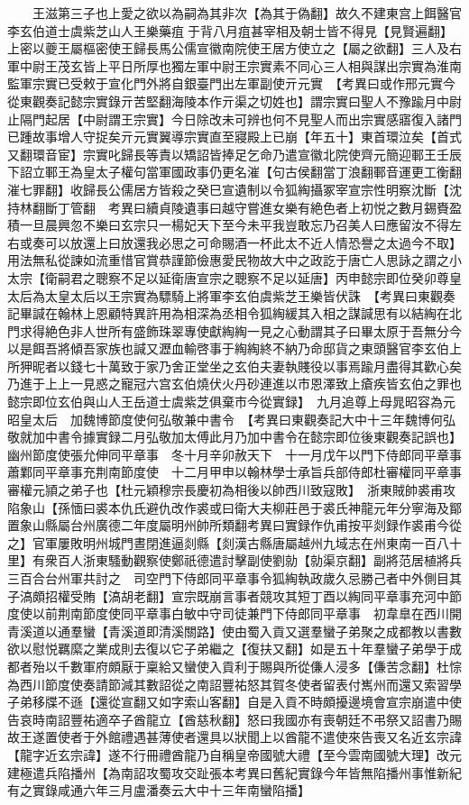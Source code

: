 　　王滋第三子也上愛之欲以為嗣為其非次【為其于偽翻】故久不建東宫上餌醫官李玄伯道士虞紫芝山人王樂藥疽于背八月疽甚宰相及朝士皆不得見【見賢遍翻】上密以夔王屬樞密使王歸長馬公儒宣徽南院使王居方使立之【屬之欲翻】三人及右軍中尉王茂玄皆上平日所厚也獨左軍中尉王宗實素不同心三人相與謀出宗實為淮南監軍宗實已受敕于宣化門外將自銀臺門出左軍副使亓元實　【考異曰或作邢元實今從東觀奏記懿宗實錄亓苦堅翻海陵本作亓渠之切姓也】謂宗實曰聖人不豫踰月中尉止隔門起居【中尉謂王宗實】今日除改未可辨也何不見聖人而出宗實感寤復入諸門已踵故事增人守捉矣亓元實翼導宗實直至寢殿上已崩【年五十】東首環泣矣【首式又翻環音宦】宗實叱歸長等責以矯詔皆捧足乞命乃遣宣徽北院使齊元簡迎鄆王壬辰下詔立鄆王為皇太子權句當軍國政事仍更名漼【句古侯翻當丁浪翻鄆音運更工衡翻漼七罪翻】收歸長公儒居方皆殺之癸巳宣遺制以令狐綯攝冢宰宣宗性明察沈斷【沈持林翻斷丁管翻　考異曰續貞陵遺事曰越守嘗進女樂有絶色者上初悦之數月錫賚盈積一旦晨興忽不樂曰玄宗只一楊妃天下至今未平我豈敢忘乃召美人曰應留汝不得左右或奏可以放還上曰放還我必思之可命賜酒一杯此太不近人情恐譽之太過今不取】用法無私從諫如流重惜官賞恭謹節儉惠愛民物故大中之政訖于唐亡人思詠之謂之小太宗【衛嗣君之聰察不足以延衛唐宣宗之聰察不足以延唐】丙申懿宗即位癸卯尊皇太后為太皇太后以王宗實為驃騎上將軍李玄伯虞紫芝王樂皆伏誅　【考異曰東觀奏記畢諴在翰林上恩顧特異許用為相深為丞相令狐綯緩其入相之謀諴思有以結綯在北門求得絶色非人世所有盛飾珠翠專使獻綯綯一見之心動謂其子曰畢太原于吾無分今以是餌吾將傾吾家族也諴又瀝血輸啓事于綯綯終不納乃命邸貨之東頭醫官李玄伯上所狎昵者以錢七十萬致于家乃舍正堂坐之玄伯夫妻執賤役以事焉踰月盡得其歡心矣乃進于上上一見惑之寵冠六宫玄伯燒伏火丹砂連進以市恩澤致上瘡疾皆玄伯之罪也懿宗即位玄伯與山人王岳道士虞紫芝俱棄市今從實録】　九月追尊上母晁昭容為元昭皇太后　加魏博節度使何弘敬兼中書令　【考異曰東觀奏記大中十三年魏博何弘敬就加中書令據實録二月弘敬加太傅此月乃加中書令在懿宗即位後東觀奏記誤也】幽州節度使張允伸同平章事　冬十月辛卯赦天下　十一月戊午以門下侍郎同平章事蕭鄴同平章事充荆南節度使　十二月甲申以翰林學士承旨兵部侍郎杜審權同平章事審權元頴之弟子也【杜元穎穆宗長慶初為相後以帥西川致寇敗】　浙東賊帥裘甫攻陷象山【孫愐曰裘本仇氏避仇改作裘或曰衛大夫柳莊邑于裘氏神龍元年分寧海及鄮置象山縣屬台州廣德二年度屬明州帥所類翻考異曰實録作仇甫按平剡録作裘甫今從之】官軍屢敗明州城門晝閉進逼剡縣【剡漢古縣唐屬越州九域志在州東南一百八十里】有衆百人浙東騷動觀察使鄭祇德遣討擊副使劉勍【勍渠京翻】副將范居植將兵三百合台州軍共討之　司空門下侍郎同平章事令狐綯執政歲久忌勝己者中外側目其子滈頗招權受賄【滈胡老翻】宣宗既崩言事者競攻其短丁酉以綯同平章事充河中節度使以前荆南節度使同平章事白敏中守司徒兼門下侍郎同平章事　初韋臯在西川開青溪道以通羣蠻【青溪道即清溪關路】使由蜀入貢又選羣蠻子弟聚之成都教以書數欲以慰悦羈縻之業成則去復以它子弟繼之【復扶又翻】如是五十年羣蠻子弟學于成都者殆以千數軍府頗厭于稟給又蠻使入貢利于賜與所從傔人浸多【傔苦念翻】杜悰為西川節度使奏請節減其數詔從之南詔豐祐怒其賀冬使者留表付嶲州而還又索習學子弟移牒不遜【還從宣翻又如字索山客翻】自是入貢不時頗擾邊境會宣宗崩遣中使告哀時南詔豐祐適卒子酋龍立【酋慈秋翻】怒曰我國亦有喪朝廷不弔祭又詔書乃賜故王遂置使者于外館禮遇甚薄使者還具以狀聞上以酋龍不遣使來告喪又名近玄宗諱【龍字近玄宗諱】遂不行冊禮酋龍乃自稱皇帝國號大禮【至今雲南國號大理】改元建極遣兵陷播州【為南詔攻蜀攻交趾張本考異曰舊紀實錄今年皆無陷播州事惟新紀有之實錄咸通六年三月盧潘奏云大中十三年南蠻陷播】

